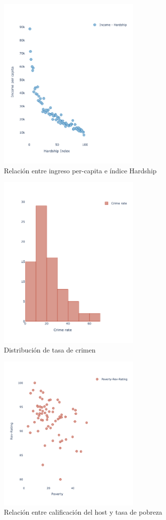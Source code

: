 \documentclass[11pt,a4paper]{article}
\begin{document}
\begin{figure}[!h]
    \centering
    \includegraphics[width=7cm]{Part1 graph4.png}
   \caption{Relación entre ingreso per-capita e índice Hardship}
    \label{fig:my_label}
\end{figure}

\begin{figure}[!h]
    \centering
    \includegraphics[width=7cm]{Part1 graph5.png}
   \caption{Distribución de tasa de crimen}
    \label{fig:my_label}
\end{figure}

\begin{figure}[!h]
    \centering
    \includegraphics[width=7cm]{Part1 graph6.png}
   \caption{Relación entre calificación del host y tasa de pobreza}
    \label{fig:my_label}
\end{figure}
\end{document}
